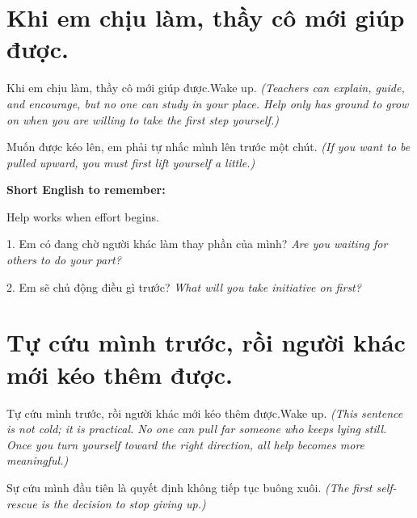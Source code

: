 \section{Khi em chịu làm, thầy cô mới giúp được.}
\begin{truyen}{Khi em chịu làm, thầy cô mới giúp được.}{Wake up.}
\textit{(Teachers can explain, guide, and encourage, but no one can study in your place. Help only has ground to grow on when you are willing to take the first step yourself.)}
\end{truyen}

\begin{baihoc}
Muốn được kéo lên, em phải tự nhấc mình lên trước một chút.
\textit{(If you want to be pulled upward, you must first lift yourself a little.)}
\end{baihoc}

\begin{ghinhoanh}
\textbf{Short English to remember:}

Help works when effort begins.

\end{ghinhoanh}

\begin{tuhocnhanh}
1. Em có đang chờ người khác làm thay phần của mình? \textit{Are you waiting for others to do your part?}

2. Em sẽ chủ động điều gì trước? \textit{What will you take initiative on first?}
\end{tuhocnhanh}
\ngancach

\section{Tự cứu mình trước, rồi người khác mới kéo thêm được.}
\begin{truyen}{Tự cứu mình trước, rồi người khác mới kéo thêm được.}{Wake up.}
\textit{(This sentence is not cold; it is practical. No one can pull far someone who keeps lying still. Once you turn yourself toward the right direction, all help becomes more meaningful.)}
\end{truyen}

\begin{baihoc}
Sự cứu mình đầu tiên là quyết định không tiếp tục buông xuôi.
\textit{(The first self-rescue is the decision to stop giving up.)}
\end{baihoc}

